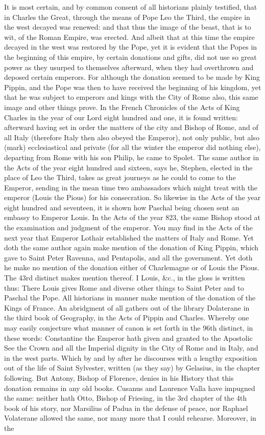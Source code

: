 It is most certain, and by common consent of all historians plainly testified, that in Charles the Great, through the means of Pope Leo the Third, the empire in the west decayed was renewed: and that thus the image of the beast, that is to wit, of the Roman Empire, was erected. And albeit that at this time the empire decayed in the west was restored by the Pope, yet it is evident that the Popes in the beginning of this empire, by certain donations and gifts, did not use so great power as they usurped to themselves afterward, when they had overthrown and deposed certain emperors. For although the donation seemed to be made by King Pippin, and the Pope was then to have received the beginning of his kingdom, yet that he was subject to emperors and kings with the City of Rome also, this same image and other things prove. In the French Chronicles of the Acts of King Charles in the year of our Lord eight hundred and one, it is found written: afterward having set in order the matters of the city and Bishop of Rome, and of all Italy (therefore Italy then also obeyed the Emperor), not only public, but also (mark) ecclesiastical and private (for all the winter the emperor did nothing else), departing from Rome with his son Philip, he came to Spolet. The same author in the Acts of the year eight hundred and sixteen, says he, Stephen, elected in the place of Leo the Third, takes as great journeys as he could to come to the Emperor, sending in the mean time two ambassadors which might treat with the emperor (Louis the Pious) for his consecration. So likewise in the Acts of the year eight hundred and seventeen, it is shown how Paschal being chosen sent an embassy to Emperor Louis. In the Acts of the year 823, the same Bishop stood at the examination and judgment of the emperor. You may find in the Acts of the next year that Emperor Lothair established the matters of Italy and Rome. Yet doth the same author again make mention of the donation of King Pippin, which gave to Saint Peter Ravenna, and Pentapolis, and all the government. Yet doth he make no mention of the donation either of Charlemagne or of Louis the Pious. The 43rd distinct makes mention thereof. I Louis, \&c., in the gloss is written thus: There Louis gives Rome and diverse other things to Saint Peter and to Paschal the Pope. All historians in manner make mention of the donation of the Kings of France. An abridgment of all gathers out of the library Dolaterane in the third book of Geography, in the Acts of Pippin and Charles. Whereby one may easily conjecture what manner of canon is set forth in the 96th distinct, in these words: Constantine the Emperor hath given and granted to the Apostolic See the Crown and all the Imperial dignity in the City of Rome and in Italy, and in the west parts. Which by and by after he discourses with a lengthy exposition out of the life of Saint Sylvester, written (as they say) by Gelasius, in the chapter following. But Antony, Bishop of Florence, denies in his History that this donation remains in any old books. Cusanus and Laurence Valla have impugned the same: neither hath Otto, Bishop of Friesing, in the 3rd chapter of the 4th book of his story, nor Marsilius of Padua in the defense of peace, nor Raphael Volaterane allowed the same, nor many more that I could rehearse. Moreover, in the 
